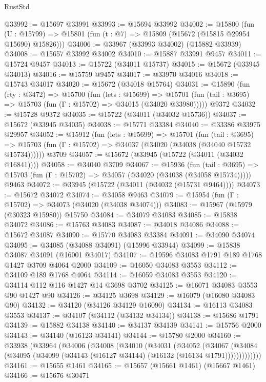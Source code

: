 \begin{lexlean}{RustStd}
\begin{coremodule}
@33992 := @15697 @33991
@33993 := @15694 @33992
@34002 := @15800
    (fun (U : @15799) => @15801 (fun (t : @7) => @15809 (@15672 (@15815 @29954 @15690) @15826)))
@34006 := @33967 (@33993 @34002) (@15882 @33939)
@34008 := @15657 @33992 @34002
@34010 := @15887 @33991 @9457
@34011 := @15724 @9457
@34013 := @15722 (@34011 @15737)
@34015 := @15672 (@33945 @34013)
@34016 := @15759 @9457
@34017 := @33970 @34016
@34018 := @15743 @34017
@34020 := @15672 (@34018 @15764)
@34031 := @15890
    (fun (rty : @3472) =>
    @15700
      (fun (lets : @15699) =>
      @15701 (fun (tail : @3695) => @15703 (fun (Γ : @15702) => @34015 (@34020 @33980)))))
    @9372
@34032 := @15728 @9372
@34035 := @15722 (@34011 (@34032 @15736))
@34037 := @15672 (@33945 @34035)
@34038 := @15771 @33384
@34040 := @33386 @33975 @29957
@34052 := @15912
    (fun (lets : @15699) =>
    @15701
      (fun (tail : @3695) =>
      @15703 (fun (Γ : @15702) => @34037 (@34020 (@34038 (@34040 @15732 @15734))))))
    @3709
@34057 := @15672 (@33945 (@15722 (@34011 (@34032 @16841))))
@34058 := @34040 @3709
@34067 := @15936
    (fun (tail : @3695) => @15703 (fun (Γ : @15702) => @34057 (@34020 (@34038 (@34058 @15734)))))
    @9463
@34072 := @33945 (@15722 (@34011 (@34032 (@15731 @9464))))
@34073 := @15672 @34072
@34074 := @34058 @9463
@34079 := @15954 (fun (Γ : @15702) => @34073 (@34020 (@34038 @34074)))
@34083 := @15967 (@15979 (@30323 @15980)) @15750
@34084 := @34079 @34083
@34085 := @15838 @34072
@34086 := @15763 @34083
@34087 := @34018 @34086
@34088 := @15672 @34087
@34090 := @15770 @34083 @33384
@34091 := @34090 @34074
@34095 := @34085 (@34088 @34091) (@15996 @33944)
@34099 := @15838 @34087 @34091 (@16001 @34017)
@34107 := @19596 @34083 @1791 @189 @1768 @1427 @3709 @4064 @2000
@34109 := @16050 @34083 @3553
@34112 := @34109 @189 @1768 @4064
@34114 := @16059 @34083 @3553
@34120 := @34114 @112 @116 @1427 @14 @3698 @3702
@34125 := @16071 @34083 @3553 @90 @1427 @90
@34126 := @34125 @3698
@34129 := @16079 (@16080 @34083 @90)
@34132 := @34120 (@34126 @34129 @16090)
@34134 := @16113 @34083 @3553
@34137 := @34107 (@34112 (@34132 @34134))
@34138 := @15686 @1791
@34139 := @15882 @34138
@34140 := @34137 @34139
@34141 := @15756 @2000
@34143 := @34140 (@16123 @34141)
@34144 := @15780 @2000
@34160 := @33938
    (@33964
      (@34006
        (@34008
          (@34010
            (@34031
              (@34052
                (@34067
                  (@34084 (@34095 (@34099 (@34143 (@16127 @34144) (@16132 (@16134 @1791)))))))))))))
@34161 := @15655 @1461
@34165 := @15657 (@15661 @1461) (@15667 @1461)
@34166 := @15676 @30471

\end{coremodule}
\end{lexlean}
